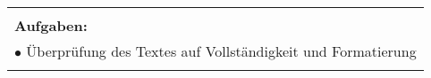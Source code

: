 \begin{table}[!h]
\begin{center}
\begin{tabular}{|p{35mm}||p{55mm}|p{50mm}||p{40mm}|}
   \multicolumn{4}{|p{150mm}|}{}\\
   \multicolumn{4}{|p{150mm}|}{\textbf{Aufgaben:}}\\
   \multicolumn{4}{|p{150mm}|}{$\bullet$ Überprüfung des Textes auf Vollständigkeit und Formatierung}\\
   \multicolumn{4}{|p{150mm}|}{}\\
   \hline
  \end{tabular}
 \end{center}
\end{table}